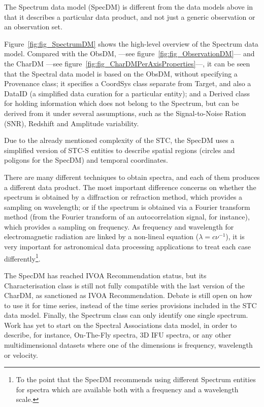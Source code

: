 			The Spectrum data model (SpecDM) is different from the
			data models above in that it describes a particular
			data product, and not just a generic observation or an
			observation set.
			
			 Figure~\ref{fig:fig_SpectrumDM} shows the high-level
			overview of the Spectrum data model. Compared with the
			ObsDM, ---see figure~\ref{fig:fig_ObservationDM}--- and
			the CharDM ---see
			figure~\ref{fig:fig_CharDMPerAxisProperties}---, it can be
			seen that the Spectral data model is based on the
			ObsDM, without specifying a Provenance class; it
			specifies a CoordSys class separate from Target, and
			also a DataID (a simplified data curation for a
			particular entity); and a Derived class for holding
			information which does not belong to the Spectrum, but
			can be derived from it under several assumptions, such
			as the Signal-to-Noise Ration (SNR), Redshift and
			Amplitude variability.
			
			 Due to the already mentioned complexity of the STC,
			the SpecDM uses a simplified version of STC-S entities
			to describe spatial regions (circles and poligons for
			the SpecDM) and temporal coordinates.
			
			 There are many different techniques to obtain spectra,
			and each of them produces a different data product.
			The most important difference concerns on whether the
			spectrum is obtained by a diffraction or refraction
			method, which provides a sampling on wavelength; or if
			the spectrum is obtained via a Fourier transform
			method (from the Fourier transform of an autocorrelation
			signal, for instance), which provides a sampling on
			frequency. As frequency and wavelength for
			electromagnetic radiation are linked by a non-lineal 
			equation ($\lambda = c\nu^{-1}$), it is very important
			for astronomical data processing applications to
			treat each case differently\footnote{To the point that
			the SpecDM recommends using different Spectrum entities
			for spectra which are available both with a frequency
			and a wavelength scale.}.
			
			 The SpecDM has reached IVOA Recommendation status, but
			its Characterisation class is still not fully
			compatible with the last version of the CharDM, as
			sanctioned as IVOA Recommendation. Debate is still
			open on how to use it for time series, instead of the
			time series provisions included in the STC data model.
			Finally, the Spectrum class can only identify one
			single spectrum. Work has yet to start on the
			Spectral Associations data model, in order to describe,
			for instance, On-The-Fly spectra, 3D IFU spectra, or
			any other multidimensional datasets where one of the
			dimensions is frequency, wavelength or velocity.
			
